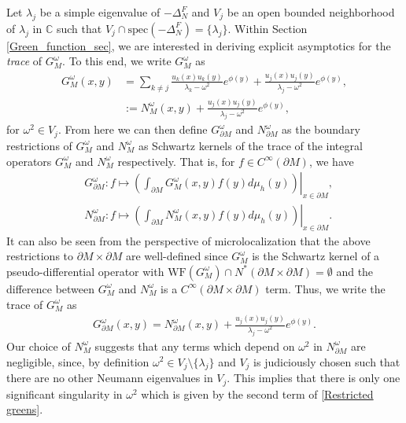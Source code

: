 \documentclass[12pt,a4paper]{amsart}
\numberwithin{equation}{section}
\theoremstyle{plain}
\theoremstyle{definition}
\begin{document}
Let $\lambda_j$ be a simple eigenvalue of $-\Delta_N^F$ and $V_j$ be an open bounded neighborhood of $\lambda_j$ in $\mathbb{C}$ such that $V_j\cap \mathrm{spec}(-\Delta_N^F) = \{\lambda_j\}$. Within Section \ref{Green_function_sec}, we are interested in deriving explicit asymptotics for the \textit{trace} of $G^\omega_M$. To this end, we write $G^\omega_M$ as 
	\begin{align*}
		G^\omega_M(x,y) &= \sum_{k\neq j} \frac{u_k(x)u_k(y)}{\lambda_k-\omega^2}e^{\phi(y)} + \frac{u_j(x)u_j(y)}{\lambda_j-\omega^2}e^{\phi(y)},\\
		&:= N^\omega_M(x,y) + \frac{u_j(x)u_j(y)}{\lambda_j-\omega^2}e^{\phi(y)},
	\end{align*}
	for $\omega^2\in V_j$. From here we can then define $G^\omega_{\partial M}$ and $N^\omega_{\partial M}$ as the boundary restrictions of $G^\omega_M$ and $N^\omega_M$ as Schwartz kernels of the trace of the integral operators $G^\omega_M$ and $N^\omega_M$ respectively. That is, for $f\in C^\infty(\partial M)$, we have 
	\begin{align*}
		&G^\omega_{\partial M}:f\mapsto \left.\left(\int_{\partial M} G^\omega_M(x,y)f(y)d\mu_h(y)\right)\right\vert_{x\in \partial M},\\
		&N^\omega_{\partial M}:f\mapsto \left.\left(\int_{\partial M} N^\omega_M(x,y)f(y)d\mu_h(y)\right)\right\vert_{x\in \partial M}.
	\end{align*}
	It can also be seen from the perspective of microlocalization that the above restrictions to $\partial M \times \partial M$ are well-defined since $G^\omega_M$ is the Schwartz kernel of a pseudo-differential operator with $\mathrm{WF}(G^\omega_M)\cap N^*(\partial M\times \partial M)=\emptyset$ and the difference between $G^\omega_M$ and $N^\omega_M$ is a $C^\infty(\partial M\times \partial M)$ term. Thus, we write the trace of $G^\omega_M$ as 
	\begin{align}
		G^\omega_{\partial M}(x,y) = N^\omega_{\partial M}(x,y) +\frac{u_j(x)u_j(y)}{\lambda_j-\omega^2}e^{\phi(y)}.\label{Restricted greens}
	\end{align}
 Our choice of $N^\omega_M$ suggests that any terms which depend on $\omega^2$ in $N^\omega_{\partial M}$ are negligible, since, by definition $\omega^2\in V_j\setminus \{\lambda_j\}$ and $V_j$ is judiciously chosen such that there are no other Neumann eigenvalues in $V_j$. This implies that there is only one significant singularity in $\omega^2$ which is given by the second term of \eqref{Restricted greens}. 
\end{document}
